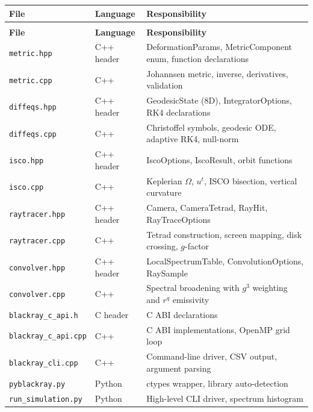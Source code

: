 \documentclass[11pt,twoside]{article}
\begin{document}
\begin{longtable}{>{\ttfamily}p{3.5cm}p{2cm}p{5cm}}
\toprule
\textbf{File} & \textbf{Language} & \textbf{Responsibility} \\
\midrule
\endfirsthead
\multicolumn{3}{c}{\textit{continued from previous page}} \\
\toprule
\textbf{File} & \textbf{Language} & \textbf{Responsibility} \\
\midrule
\endhead
\bottomrule
\endfoot
\midrule
\endlastfoot

\texttt{metric.hpp}            & C++ header   & DeformationParams, MetricComponent enum, function declarations \\
\texttt{metric.cpp}            & C++            & Johannsen metric, inverse, derivatives, validation \\
\texttt{diffeqs.hpp}           & C++ header   & GeodesicState (8D), IntegratorOptions, RK4 declarations \\
\texttt{diffeqs.cpp}           & C++            & Christoffel symbols, geodesic ODE, adaptive RK4, null-norm \\
\texttt{isco.hpp}              & C++ header   & IscoOptions, IscoResult, orbit functions \\
\texttt{isco.cpp}              & C++            & Keplerian $\Omega$, $u^t$, ISCO bisection, vertical curvature \\
\texttt{raytracer.hpp}         & C++ header   & Camera, CameraTetrad, RayHit, RayTraceOptions \\
\texttt{raytracer.cpp}         & C++            & Tetrad construction, screen mapping, disk crossing, $g$-factor \\
\texttt{convolver.hpp}         & C++ header   & LocalSpectrumTable, ConvolutionOptions, RaySample \\
\texttt{convolver.cpp}         & C++            & Spectral broadening with $g^3$ weighting and $r^q$ emissivity \\
\texttt{blackray\_c\_api.h}    & C header     & C ABI declarations \\
\texttt{blackray\_c\_api.cpp}  & C++            & C ABI implementations, OpenMP grid loop \\
\texttt{blackray\_cli.cpp}     & C++            & Command-line driver, CSV output, argument parsing \\
\texttt{pyblackray.py}         & Python         & ctypes wrapper, library auto-detection \\
\texttt{run\_simulation.py}   & Python         & High-level CLI driver, spectrum histogram \\

\end{longtable}
\end{document}
